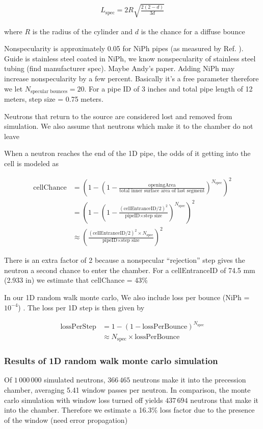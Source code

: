 \begin{gather}
    L_\text{spec} = 2 R\sqrt{\frac{2(2-d)}{3d} }
\end{gather}


where $R$ is the radius of the cylinder and $d$ is the chance for a diffuse bounce

Nonspecularity is approximately 0.05 for NiPh pipes (as measured by Ref. \cite{pattie_jr_evaluation_2017}). {\color{blue}Guide is stainless steel coated in NiPh, we know nonspecularity of stainless steel tubing (find manufacturer spec). Maybe Andy's paper. Adding NiPh may increase nonspecularity by a few percent. Basically it's a free parameter} therefore we let $N_\text{specular bounces} = 20$. For a pipe ID of 3 inches and total pipe length of 12 meters, step size = 0.75 meters.

Neutrons that return to the source are considered lost and removed from simulation. We also assume that neutrons which make it to the chamber do not leave

When a neutron reaches the end of the 1D pipe, the odds of it getting into the cell is modeled as

\begin{align}
    \text{cellChance} &= \left(1 - \left( 1 - \frac{ \text{openingArea} } {\text{total inner surface area of last segment}} \right) ^ {N_\text{spec}} \right)^2 \\
    &= \left(1 - \left( 1 - \frac{ (\text{cellEntranceID}/2)^{2} } {\text{pipeID}\times\text{step size}} \right) ^ {N_\text{spec}} \right) ^2 \\
    &\approx \left( \frac{ (\text{cellEntranceID}/2)^{2} \times N_\text{spec} } {\text{pipeID}\times\text{step size}} \right)^2
\end{align}

There is an extra factor of 2 because a nonspecular ``rejection'' step gives the neutron a second chance to enter the chamber. For a cellEntranceID of 74.5 mm (2.933 in) we estimate that cellChance = 43\%

In our 1D random walk monte carlo, We also include loss per bounce (NiPh = $10^{-4}$) \cite{pattie_jr_evaluation_2017}. The loss per 1D step is then given by

\begin{align}
    \text{lossPerStep} &= 1 - \left(1 - \text{lossPerBounce} \right)^{N_\text{spec}}\\
    &\approx N_\text{spec} \times \text{lossPerBounce}
\end{align}

\subsubsection{Results of 1D random walk monte carlo simulation}

Of $1\,000\,000$ simulated neutrons, $366\,465$ neutrons make it into the precession chamber, averaging 5.41 window passes per neutron. In comparison, the monte carlo simulation with window loss turned off yields $437\,694$ neutrons that make it into the chamber. Therefore we estimate a 16.3\% loss factor due to the presence of the window (need error propagation)